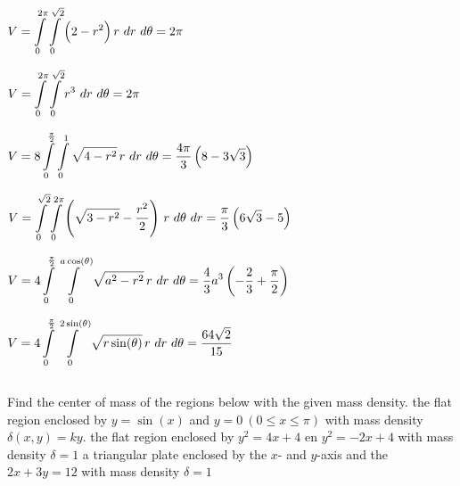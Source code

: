 \begin{Answer}
    
        \Question $V = \displaystyle \int\limits_0^{2\pi} \displaystyle \int\limits_0^{\sqrt{2}} \left(2-r^2\right) r \ dr \ d\theta = 2\pi$
        
        \Question $V = \displaystyle \int\limits_0^{2\pi} \displaystyle \int\limits_0^{\sqrt{2}} r^3 \ dr \ d\theta = 2\pi$
     
        \Question $V = 8 \displaystyle \int\limits_0^{\frac{\pi}{2}} \displaystyle \int\limits_0^{1} \sqrt{4 - r^2}\, r \ dr \ d\theta = \dfrac{4 \pi}{3}\left(8-3\sqrt{3}\right)$

        \Question $V = \ds \int\limits_0^{\sqrt{2}} \ds \int\limits_0^{2\pi} \left(\sqrt{3-r^2} - \dfrac{r^2}{2}  \right)\, r\ d\theta \ dr = \dfrac{\pi}{3}\left( 6\sqrt{3} - 5 \right)$

        \Question $V = 4 \displaystyle \int\limits_0^{\frac{\pi}{2}} \displaystyle \int\limits_0^{a\cos(\theta)} \sqrt{a^2 - r^2}\, r \ dr \ d\theta = \dfrac{4}{3}a^3 \left(- \dfrac{2}{3} + \dfrac{\pi}{2} \right)$
        
        \Question $V = 4 \ds \int\limits_0^{\frac{\pi}{2}} \ds \int\limits_0^{2\sin(\theta)} \sqrt{r \sin(\theta)}\, r \ dr \ d\theta = \dfrac{64 \sqrt{2}}{15}$
    
    
\end{Answer}

\subsection*{}
\begin{Exercise} Find the center of mass of the  regions below with the given mass density.
        \Question[difficulty = 1]  the flat region enclosed  by $y= \sin (x)$ and $y=0 \ (0\leq x \leq \pi)$ with mass density \\ $\delta(x,y) = ky$. 
        \Question[difficulty = 3]  the flat region enclosed by $y^2 = 4x + 4$ en $y^2 = -2x+4$ with mass density $\delta = 1$ 
        \Question[difficulty = 2]  a triangular plate enclosed by the $x$- and $y$-axis and the $2x+3y=12$ with mass density $\delta = 1$ 
\end{Exercise}

